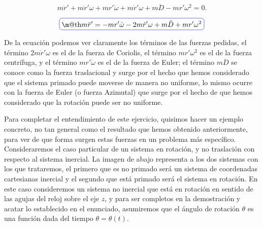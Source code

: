 \documentclass[a4paper,10pt]{article}
\makeatletter
\numberwithin{equation}{section}
\newcommand*{\boxcolor}{blue}
\renewcommand{\boxed}[1]{\textcolor{\boxcolor}{%
\tikz[baseline={([yshift=-1ex]current bounding box.center)}] \node [rectangle, minimum width=1ex,rounded corners,draw] {\normalcolor\m@th$\displaystyle#1$};}}
\makeatother
\begin{document}
\begin{equation}
 m\ddot{r}' + m\dot{r}'\omega + mr'\dot{\omega} + m \dot{r}' \omega  + m\ddot{D} 
 -  mr'\omega^2 = 0.
\end{equation}

\begin{equation}
 \boxed{m\ddot{r}' = - m r'\dot{\omega} - 2m \dot{r}' \omega + m\ddot{D} +  mr'\omega^2}
\label{eq:finalRotacionTraslacion}
 \end{equation}

De la ecuación  podemos ver claramente los términos 
de las fuerzas pedidas, el término $ 2m \dot{r}' \omega$ es el de la fuerza de Coriolis, 
el término $mr'\omega^2$ es el de la fuerza centrífuga, y el término $mr'\dot{\omega}$ 
es el de la fuerza de Euler; el término $m\ddot{D}$ se conoce como la fuerza traslacional 
y surge por el hecho que hemos considerado que el sistema primado puede moverse de 
manera no uniforme, lo mismo ocurre con la fuerza de Euler (o fuerza Azimutal) que surge 
por el hecho de que hemos considerado que la rotación puede ser no uniforme.

\vspace{.3cm}

Para completar el entendimiento de este ejercicio, quisimos hacer un ejemplo concreto, no 
tan general como el resultado que hemos obtenido anteriormente, para ver de que forma 
surgen estas fuerzas en un problema más específico. Consideraremos el caso particular 
de un sistema en rotación, y no traslación con respecto al sistema inercial. La imagen de abajo representa a los dos sistemas con los que trataremos, el primero que 
es no primado será un sistema de coordenadas cartesianas inercial y el segundo que 
está primado será el sistema en rotación. En este caso consideremos un sistema 
no inercial que está en rotación en sentido de las agujas del reloj sobre el eje $z$, y para  ser completos
en la demostración y  acatar lo establecido en el enunciado,  asumiremos que el
ángulo de rotación $\theta$ es una función dada del tiempo $\theta = \theta(t)$.
\end{document}
